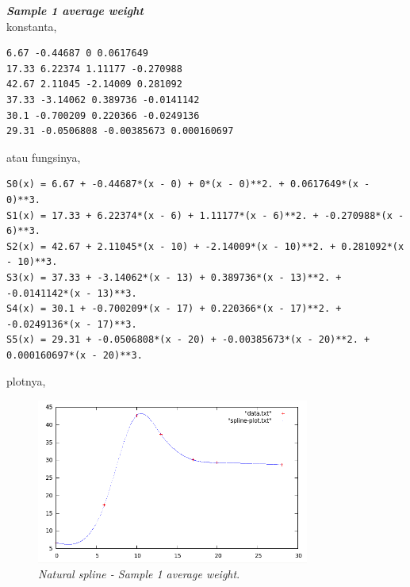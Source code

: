 \documentclass[paper=a4, fontsize=11pt]{scrartcl}
\numberwithin{equation}{section} %
\numberwithin{figure}{section} %
\numberwithin{table}{section} %
\begin{document}
\textit{\textbf{Sample 1 average weight}}\\
konstanta,
\begin{small}
\begin{verbatim}
6.67 -0.44687 0 0.0617649
17.33 6.22374 1.11177 -0.270988
42.67 2.11045 -2.14009 0.281092
37.33 -3.14062 0.389736 -0.0141142
30.1 -0.700209 0.220366 -0.0249136
29.31 -0.0506808 -0.00385673 0.000160697
\end{verbatim}
\end{small}
atau fungsinya,
\begin{small}
\begin{verbatim}
S0(x) = 6.67 + -0.44687*(x - 0) + 0*(x - 0)**2. + 0.0617649*(x - 0)**3.
S1(x) = 17.33 + 6.22374*(x - 6) + 1.11177*(x - 6)**2. + -0.270988*(x - 6)**3.
S2(x) = 42.67 + 2.11045*(x - 10) + -2.14009*(x - 10)**2. + 0.281092*(x - 10)**3.
S3(x) = 37.33 + -3.14062*(x - 13) + 0.389736*(x - 13)**2. + -0.0141142*(x - 13)**3.
S4(x) = 30.1 + -0.700209*(x - 17) + 0.220366*(x - 17)**2. + -0.0249136*(x - 17)**3.
S5(x) = 29.31 + -0.0506808*(x - 20) + -0.00385673*(x - 20)**2. + 0.000160697*(x - 20)**3.
\end{verbatim}
\end{small}
plotnya, 
\begin{figure}
	\centering
	\includegraphics[width=0.8\textwidth]
		{sample1.png}
	\caption{\textit{Natural spline - Sample 1 average weight}.}
\end{figure}
\end{document}
